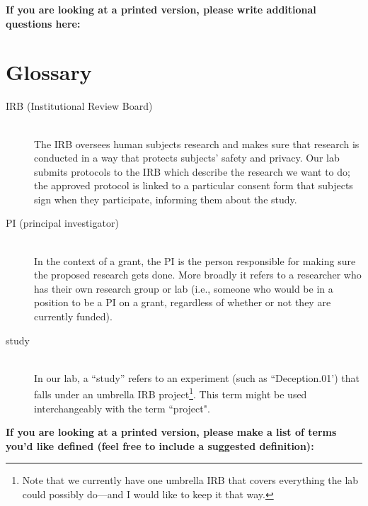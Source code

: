 \documentclass[letterpaper,12pt,oneside]{memoir}
\begin{document}
\vspace{.2in}
\noindent \textbf{\large If you are looking at a printed version, please write additional questions here:}


%

\chapter{Glossary}

\begin{description}

\item[IRB (Institutional Review Board)] \hfill \\
The IRB oversees human subjects research and makes sure that research is conducted in a way that protects subjects' safety and privacy. Our lab submits protocols to the IRB which describe the research we want to do; the approved protocol is linked to a particular consent form that subjects sign when they participate, informing them about the study.

\item[PI (principal investigator)] \hfill \\
In the context of a grant, the PI is the person responsible for making sure the proposed research gets done. More broadly it refers to a researcher who has their own research group or lab (i.e., someone who would be in a position to be a PI on a grant, regardless of whether or not they are currently funded).

\item[study] \hfill \\
In our lab, a ``study'' refers to an experiment (such as ``Deception.01') that falls under an umbrella IRB project\footnote{Note that we currently have one umbrella IRB that covers everything the lab could possibly do---and I would like to keep it that way.}. This term might be used interchangeably with the term ``project". 

\end{description}

\vspace{.2in}
\noindent \textbf{\large If you are looking at a printed version, please make a list of terms you'd like defined (feel free to include a suggested definition):}



%
%
\end{document}
